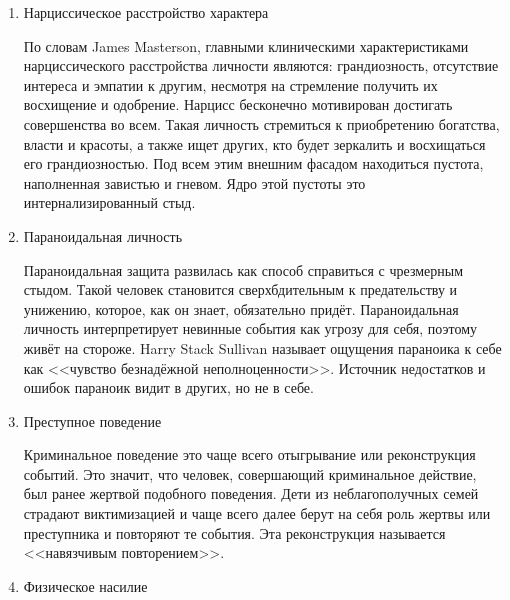 \documentclass[10pt, fleqn]{article}
\begin{document}
\begin{enumerate}
\item Нарциссическое расстройство характера

По словам James Masterson, главными клиническими характеристиками нарциссического расстройства личности являются: грандиозность, отсутствие интереса и эмпатии к другим, несмотря на стремление получить их восхищение и одобрение.
Нарцисс бесконечно мотивирован достигать совершенства во всем. Такая личность стремиться к приобретению богатства, власти и красоты, а также ищет других, кто будет зеркалить и восхищаться его грандиозностью.
Под всем этим внешним фасадом находиться пустота, наполненная завистью и гневом. Ядро этой пустоты это интернализированный стыд.

\item Параноидальная личность

Параноидальная защита развилась как способ справиться с чрезмерным стыдом. Такой человек становится сверхбдительным к предательству и унижению, которое, как он знает, обязательно придёт. Параноидальная личность интерпретирует невинные события как угрозу для себя, поэтому живёт на стороже.
Harry Stack Sullivan называет ощущения параноика к себе как <<чувство безнадёжной неполноценности>>. Источник недостатков и ошибок параноик видит в других, но не в себе.

\item Преступное поведение

Криминальное поведение это чаще всего отыгрывание или реконструкция событий. Это значит, что человек, совершающий криминальное действие, был ранее жертвой подобного поведения. Дети из неблагополучных семей страдают виктимизацией и чаще всего далее берут на себя роль жертвы или преступника и повторяют те события. Эта реконструкция называется <<навязчивым повторением>>.

\item Физическое насилие


\end{enumerate}
\end{document}
